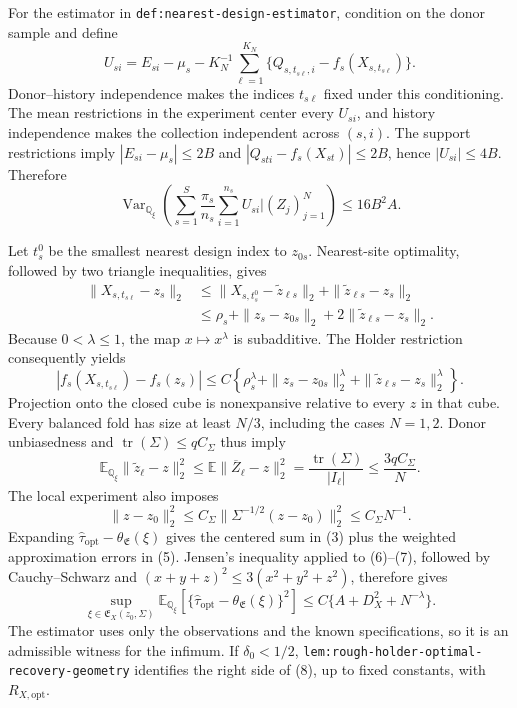 For the estimator in \texttt{def:nearest-design-estimator}, condition on the donor sample and define
\[
 U_{si}=E_{si}-\mu_s-K_N^{-1}\sum_{\ell=1}^{K_N}
 \{Q_{s,t_{s\ell},i}-f_s(X_{s,t_{s\ell}})\}.               \tag{2}
\]
Donor--history independence makes the indices \(t_{s\ell}\) fixed under this conditioning.  The mean restrictions in the experiment center every \(U_{si}\), and history independence makes the collection independent across \((s,i)\).  The support restrictions imply \(|E_{si}-\mu_s|\le2B\) and \(|Q_{sti}-f_s(X_{st})|\le2B\), hence \(|U_{si}|\le4B\).  Therefore
\[
 \operatorname{Var}_{\mathbb Q_\xi}\!\left(
 \sum_{s=1}^{S}\frac{\pi_s}{n_s}\sum_{i=1}^{n_s}U_{si}
 \mathrel{\Big|}(Z_j)_{j=1}^{N}\right)
 \le16B^2A.                                                 \tag{3}
\]

Let \(t_s^0\) be the smallest nearest design index to \(z_{0s}\).  Nearest-site optimality, followed by two triangle inequalities, gives
\[
\begin{aligned}
 \|X_{s,t_{s\ell}}-z_s\|_2
 &\le \|X_{s,t_s^0}-\widetilde z_{\ell s}\|_2
       +\|\widetilde z_{\ell s}-z_s\|_2\\
 &\le \rho_s+\|z_s-z_{0s}\|_2
       +2\|\widetilde z_{\ell s}-z_s\|_2.
\end{aligned}                                               \tag{4}
\]
Because \(0<\lambda\le1\), the map \(x\mapsto x^\lambda\) is subadditive.  The Holder restriction consequently yields
\[
 |f_s(X_{s,t_{s\ell}})-f_s(z_s)|
 \le C\left\{\rho_s^\lambda+
 \|z_s-z_{0s}\|_2^\lambda+
 \|\widetilde z_{\ell s}-z_s\|_2^\lambda\right\}.        \tag{5}
\]
Projection onto the closed cube is nonexpansive relative to every \(z\) in that cube.  Every balanced fold has size at least \(N/3\), including the cases \(N=1,2\).  Donor unbiasedness and \(\operatorname{tr}(\Sigma)\le qC_\Sigma\) thus imply
\[
 \mathbb E_{\mathbb Q_\xi}\|\widetilde z_\ell-z\|_2^2
 \le\mathbb E\|\overline Z_\ell-z\|_2^2
 =\frac{\operatorname{tr}(\Sigma)}{|I_\ell|}
 \le\frac{3qC_\Sigma}{N}.                                  \tag{6}
\]
The local experiment also imposes
\[
 \|z-z_0\|_2^2
 \le C_\Sigma\|\Sigma^{-1/2}(z-z_0)\|_2^2
 \le C_\Sigma N^{-1}.                                      \tag{7}
\]
Expanding \(\widehat\tau_{\mathrm{opt}}-\theta_{\mathfrak E}(\xi)\) gives the centered sum in (3) plus the weighted approximation errors in (5).  Jensen's inequality applied to (6)--(7), followed by Cauchy--Schwarz and \((x+y+z)^2\le3(x^2+y^2+z^2)\), therefore gives
\[
 \sup_{\xi\in\mathfrak E_X(z_0,\Sigma)}
 \mathbb E_{\mathbb Q_\xi}
 \left[\{\widehat\tau_{\mathrm{opt}}-
 \theta_{\mathfrak E}(\xi)\}^2\right]
 \le C\{A+D_X^2+N^{-\lambda}\}.                           \tag{8}
\]
The estimator uses only the observations and the known specifications, so it is an admissible witness for the infimum.  If \(\delta_0<1/2\), \texttt{lem:rough-holder-optimal-recovery-geometry} identifies the right side of (8), up to fixed constants, with \(R_{X,\mathrm{opt}}\).

